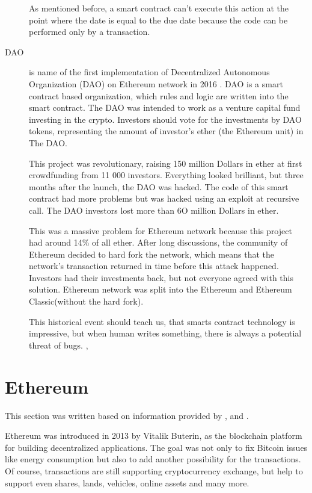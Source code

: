\documentclass[thesis=M,english]{FITthesis}[2019/12/23]
\begin{document}
\begin{description}
 As mentioned before, a smart contract can't execute this action at the point where the date is equal to the due date because the code can be performed only by a transaction.
 \label{dao}
 \item[DAO] is name of the first implementation of Decentralized Autonomous Organization (DAO) on Ethereum network in 2016 \cite{CHRISTOPH2016}. DAO is a smart contract based organization, which rules and logic are written into the smart contract. The DAO was intended to work as a venture capital fund investing in the crypto. Investors should vote for the investments by DAO tokens, representing the amount of investor's ether (the Ethereum unit) in The DAO. 
 
This project was revolutionary, raising 150 million Dollars in ether at first crowdfunding from 11 000 investors. Everything looked brilliant, but three months after the launch, the DAO was hacked. The code of this smart contract had more problems but was hacked using an exploit at recursive call. The DAO investors lost more than 6O million Dollars in ether. 

This was a massive problem for Ethereum network because this project had around 14\% of all ether. After long discussions, the community of Ethereum decided to hard fork the network, which means that the network's transaction returned in time before this attack happened. Investors had their investments back, but not everyone agreed with this solution. Ethereum network was split into the Ethereum and Ethereum Classic(without the hard fork).

This historical event should teach us, that smarts contract technology is impressive, but when human writes something, there is always a potential threat of bugs. \cite{SamuelDec242017}, \cite{CryptopediaJanuary272021}
 
 
 
\end{description}
\section{Ethereum}


This section was written based on information provided by \cite{ethereumWhitePaper}, \cite{ethereumYellowPaper} and \cite{Singhal2018}.

Ethereum was introduced in 2013 by Vitalik Buterin, as the blockchain platform for building decentralized applications. The goal was not only to fix Bitcoin issues like energy consumption \cite{Baraniuk3July2019} but also to add another possibility for the transactions. Of course, transactions are still supporting cryptocurrency exchange, but help to support even shares, lands, vehicles, online assets and many more.
\end{document}
